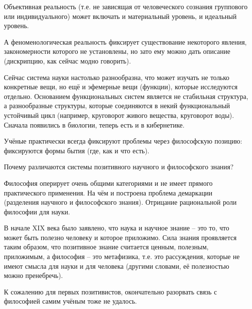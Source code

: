\documentclass[main.tex]{subfiles}
\begin{document}
Объективная реальность (т.е. не зависящая от человеческого сознания группового или индивидуального) может включать и материальный уровень, и идеальный уровень.

А феноменологическая реальность фиксирует существование некоторого явления, закономерности которого не установлены, но зато ему можно дать описание (дискрипцию, как сейчас модно говорить).



Сейчас система науки настолько разнообразна, что может изучать не только конкретные вещи, но ещё и эфемерные вещи (функции), которые исследуются отдельно.
Основанием функциональных систем является не стабильная структура, а разнообразные структуры, которые соединяются в некий функциональный устойчивый цикл (например, круговорот живого вещества, круговорот воды).
Сначала появились в биологии, теперь есть и в кибернетике.



Учёные практически всегда фиксируют проблемы через философскую позицию: фиксируются формы бытия (где, как и что есть).




Почему различаются системы позитивного научного и философского знания?

Философия оперирует очень общими категориями и не имеет прямого практического применения.
На чём и построена проблема демаркации (разделения научного и философского знания).
Отрицание рациональной роли философии для науки.

В начале XIX века было заявлено, что наука и научное знание -- это то, что может быть полезно человеку и которое приложимо.
Сила знания проявляется таким образом, что позитивное знание считается ценным, полезным, приложимым, а философия -- это метафизика, т.е. это рассуждения, которые не имеют смысла для науки и для человека (другими словами, её полезностью можно пренебречь).

К сожалению для первых позитивистов, окончательно разорвать связь с философией самим учёным тоже не удалось.

\end{document}

